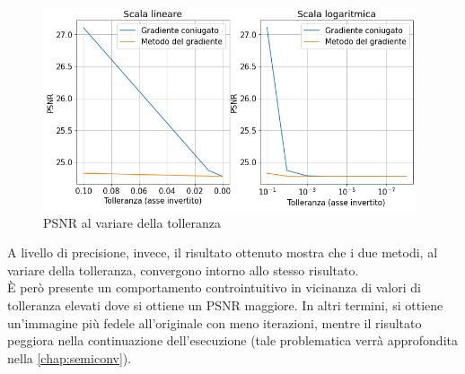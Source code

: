 \documentclass[11pt]{article}
\begin{document}
\begin{figure}[H]
    \centering
    \includegraphics[width=11cm]{iterazioni_cg_gd/1/tol_psnr.png}
    \caption{PSNR al variare della tolleranza}
    \label{fig:tol_psnr1}
\end{figure}
A livello di precisione, invece, il risultato ottenuto mostra che i due metodi, al variare della tolleranza, convergono intorno allo stesso risultato.\\
È però presente un comportamento controintuitivo in vicinanza di valori di tolleranza elevati dove si ottiene un PSNR maggiore.
In altri termini, si ottiene un'immagine più fedele all'originale con meno iterazioni, mentre il risultato peggiora nella continuazione dell'esecuzione (tale problematica verrà approfondita nella \autoref{chap:semiconv}).
\end{document}
